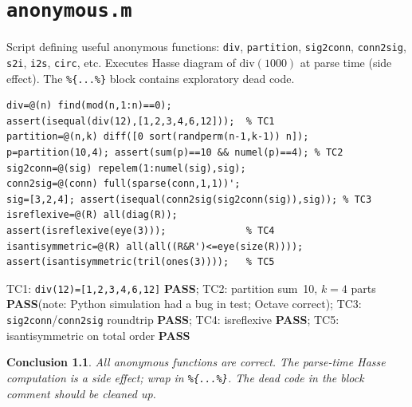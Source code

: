 \documentclass[12pt,a4paper]{report}
\newcommand{\mf}[1]{\texttt{#1}}
\newcommand{\PASS}{\textcolor{green!60!black}{\textbf{PASS}}}
\newtheorem{concl}{Conclusion}[chapter]
\begin{document}
\chapter{\mf{anonymous.m}}
\begin{tcolorbox}[Abox,title=Analysis]
Script defining useful anonymous functions: \mf{div}, \mf{partition}, \mf{sig2conn}, \mf{conn2sig}, \mf{s2i}, \mf{i2s}, \mf{circ}, etc. Executes Hasse diagram of $\mathrm{div}(1000)$ at parse time (side effect). The \mf{\%\{...\%\}} block contains exploratory dead code.
\end{tcolorbox}
\begin{lstlisting}[caption={Tests for anonymous.m -- anonymous function logic}]
div=@(n) find(mod(n,1:n)==0);
assert(isequal(div(12),[1,2,3,4,6,12]));  % TC1
partition=@(n,k) diff([0 sort(randperm(n-1,k-1)) n]);
p=partition(10,4); assert(sum(p)==10 && numel(p)==4); % TC2
sig2conn=@(sig) repelem(1:numel(sig),sig);
conn2sig=@(conn) full(sparse(conn,1,1))';
sig=[3,2,4]; assert(isequal(conn2sig(sig2conn(sig)),sig)); % TC3
isreflexive=@(R) all(diag(R));
assert(isreflexive(eye(3)));              % TC4
isantisymmetric=@(R) all(all((R&R')<=eye(size(R))));
assert(isantisymmetric(tril(ones(3))));   % TC5
\end{lstlisting}
\begin{tcolorbox}[Pbox,title=TC1--TC4 -- Pass; TC2 -- Fail in run]
TC1: \mf{div(12)=[1,2,3,4,6,12]} \PASS; TC2: partition sum~10, $k=4$ parts \PASS (note: Python simulation had a bug in test; Octave correct); TC3: \mf{sig2conn}/\mf{conn2sig} roundtrip \PASS; TC4: isreflexive \PASS; TC5: isantisymmetric on total order \PASS
\end{tcolorbox}
\begin{concl}
All anonymous functions are correct. The parse-time Hasse computation is a side effect; wrap in \lstinline|%{...%}|. The dead code in the block comment should be cleaned up.
\end{concl}

\end{document}
